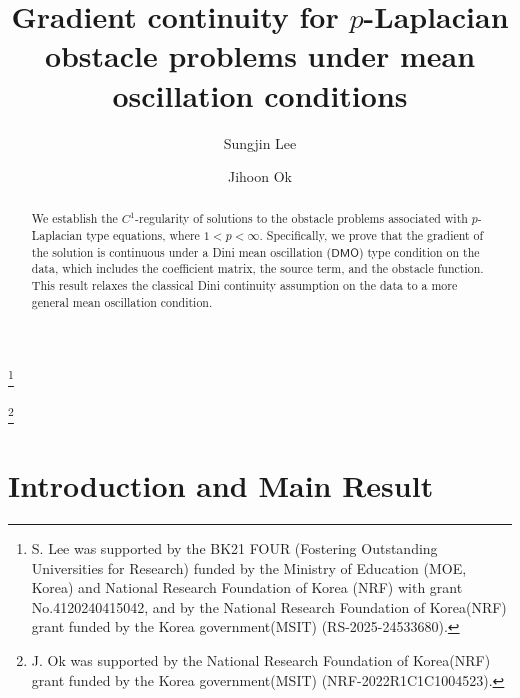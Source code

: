 \documentclass[reqno]{amsart}
\numberwithin{equation}{section}
\theoremstyle{plain}
\theoremstyle{definition}
\theoremstyle{remark}
\begin{document}
 
\title{Gradient continuity for $p$-Laplacian obstacle problems under mean oscillation conditions}


\author[S. Lee]{Sungjin Lee}
\address[S. Lee]{Department of Mathematics, Sogang University, 35 Baekbeom-ro, Mapo-gu, Seoul 04107, Republic of Korea}
\thanks{S. Lee was supported by the BK21 FOUR (Fostering Outstanding Universities for Research) funded by the Ministry of Education (MOE, Korea) and National Research Foundation of Korea (NRF) with grant No.4120240415042, and by the National Research Foundation of Korea(NRF) grant funded by the Korea government(MSIT) (RS-2025-24533680).}

\author[J. Ok]{Jihoon Ok}
\address[J. Ok]{Department of Mathematics, Sogang University, 35 Baekbeom-ro, Mapo-gu, Seoul 04107, Republic of Korea}
\thanks{J. Ok was supported by the National Research Foundation of Korea(NRF) grant funded by the Korea government(MSIT) (NRF-2022R1C1C1004523).}




\begin{abstract}
We establish the $C^1$-regularity of solutions to the obstacle problems associated with $p$-Laplacian type equations, where $1<p<\infty$. Specifically, we prove that the gradient of the solution is continuous under a Dini mean oscillation ($\mathsf{DMO}$) type condition on the data, which includes the coefficient matrix, the source term, and the obstacle function. This result relaxes the classical Dini continuity assumption on the data to a more general mean oscillation condition.
\end{abstract}

\maketitle

\section{Introduction and Main Result} \label{sec1}
 
\end{document}
